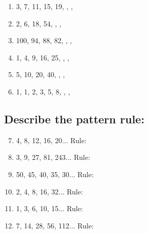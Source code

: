 \documentclass{article}
\begin{document}
\begin{enumerate}
    \item 3, 7, 11, 15, 19, \underline{\hspace{1cm}}, \underline{\hspace{1cm}}, \underline{\hspace{1cm}}
    \item 2, 6, 18, 54, \underline{\hspace{1cm}}, \underline{\hspace{1cm}}, \underline{\hspace{1cm}}
    \item 100, 94, 88, 82, \underline{\hspace{1cm}}, \underline{\hspace{1cm}}, \underline{\hspace{1cm}}
    \item 1, 4, 9, 16, 25, \underline{\hspace{1cm}}, \underline{\hspace{1cm}}, \underline{\hspace{1cm}}
    \item 5, 10, 20, 40, \underline{\hspace{1cm}}, \underline{\hspace{1cm}}, \underline{\hspace{1cm}}
    \item 1, 1, 2, 3, 5, 8, \underline{\hspace{1cm}}, \underline{\hspace{1cm}}, \underline{\hspace{1cm}}
\end{enumerate}

\subsection*{Describe the pattern rule:}

\begin{enumerate}
    \setcounter{enumi}{6}
    \item 4, 8, 12, 16, 20... Rule: \underline{\hspace{6cm}}
    \item 3, 9, 27, 81, 243... Rule: \underline{\hspace{6cm}}
    \item 50, 45, 40, 35, 30... Rule: \underline{\hspace{6cm}}
    \item 2, 4, 8, 16, 32... Rule: \underline{\hspace{6cm}}
    \item 1, 3, 6, 10, 15... Rule: \underline{\hspace{6cm}}
    \item 7, 14, 28, 56, 112... Rule: \underline{\hspace{6cm}}
\end{enumerate}
\end{document}
